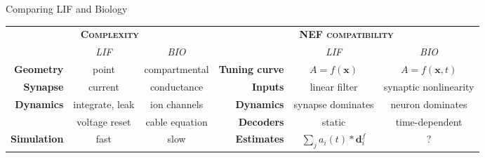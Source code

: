 \documentclass[aspectratio=169]{beamer}
\renewcommand{\emph}[1]{{\color{violet}\textit{#1}}}
\begin{document}
\begin{frame}{Comparing LIF and Biology}
  \renewcommand{\arraystretch}{1.5}
  \centering
  \begin{tabular}{r c c r c c}
  	\toprule
  		\multicolumn{3}{c}{\textbf{\textsc{Complexity}}} & \multicolumn{3}{c}{\textbf{\textsc{NEF compatibility}}}\\
  		\cmidrule(r){1-3}\cmidrule(l){4-6}
		& \emph{LIF} & \emph{BIO} & & \emph{LIF} & \emph{BIO} \\
		\cmidrule(r){1-1}\cmidrule(r){2-2}\cmidrule(r){3-3}\cmidrule(lr){4-4}\cmidrule(r){5-5}\cmidrule(l){6-6}
		\textbf{Geometry} & point & compartmental & \textbf{Tuning curve} & $A=f(\mathbf{x})$ & $A=f(\mathbf{x}, t)$ \\
		\textbf{Synapse} & current & conductance & \textbf{Inputs} & linear filter & synaptic nonlinearity \\
		\textbf{Dynamics} & integrate, leak & ion channels & \textbf{Dynamics} & synapse dominates & neuron dominates \\
				 & voltage reset & cable equation & \textbf{Decoders} & static & time-dependent \\
		\textbf{Simulation} & fast & slow & \textbf{Estimates} & $\sum_j a_i(t) * \mathbf{d}_i^f$ & ? \\
  	\bottomrule
  \end{tabular}
\end{frame}

\end{document}
